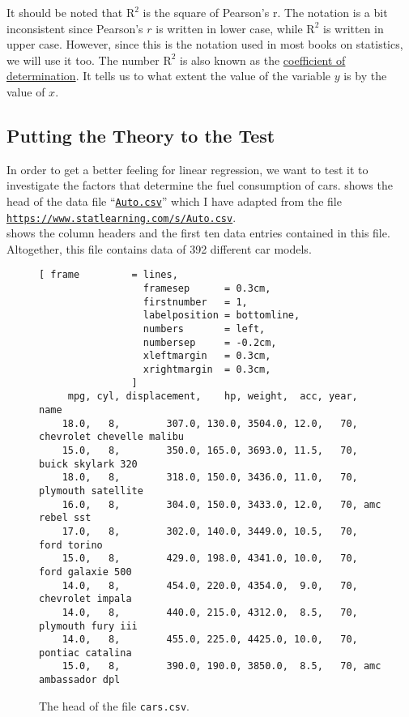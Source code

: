 It should be noted that $\mathrm{R}^2$ is the square of Pearson's \textrm{r}.  The notation is a bit
inconsistent since Pearson's $r$ is written in lower case, while $\mathrm{R}^2$ is written in upper
case.  However, since this is the notation used in most books on statistics, we will use it too.
The number $\mathrm{R}^2$ is also known as the
\href{https://en.wikipedia.org/wiki/Coefficient_of_determination}{coefficient of determination}.  It tells us 
to what extent the value of the variable $y$ is  by the value of $x$.


\subsection{Putting the Theory to the Test}
In order to get a better feeling for linear regression, we want to test it to investigate the factors that
determine the fuel consumption of cars.   shows the head of the data file 
``\href{https://www.statlearning.com/s/Auto.csv}{\texttt{Auto.csv}}''
which I have adapted from the file
\\[0.2cm]
\hspace*{1.3cm}
\href{https://www.statlearning.com/s/Auto.csv}{\texttt{https://www.statlearning.com/s/Auto.csv}}.
\\[0.2cm]
 shows the column headers and the first ten data entries contained in this file.  
Altogether, this file contains data of 392 different car models.

\begin{figure}[!ht]
\centering
\begin{Verbatim}[ frame         = lines, 
                  framesep      = 0.3cm, 
                  firstnumber   = 1,
                  labelposition = bottomline,
                  numbers       = left,
                  numbersep     = -0.2cm,
                  xleftmargin   = 0.3cm,
                  xrightmargin  = 0.3cm,
                ]
     mpg, cyl, displacement,    hp, weight,  acc, year, name
    18.0,   8,        307.0, 130.0, 3504.0, 12.0,   70, chevrolet chevelle malibu
    15.0,   8,        350.0, 165.0, 3693.0, 11.5,   70, buick skylark 320
    18.0,   8,        318.0, 150.0, 3436.0, 11.0,   70, plymouth satellite
    16.0,   8,        304.0, 150.0, 3433.0, 12.0,   70, amc rebel sst
    17.0,   8,        302.0, 140.0, 3449.0, 10.5,   70, ford torino
    15.0,   8,        429.0, 198.0, 4341.0, 10.0,   70, ford galaxie 500
    14.0,   8,        454.0, 220.0, 4354.0,  9.0,   70, chevrolet impala
    14.0,   8,        440.0, 215.0, 4312.0,  8.5,   70, plymouth fury iii
    14.0,   8,        455.0, 225.0, 4425.0, 10.0,   70, pontiac catalina
    15.0,   8,        390.0, 190.0, 3850.0,  8.5,   70, amc ambassador dpl
\end{Verbatim}
\vspace*{-0.3cm}
\caption{The head of the file \texttt{cars.csv}.}
\label{fig:cars.csv}
\end{figure}

